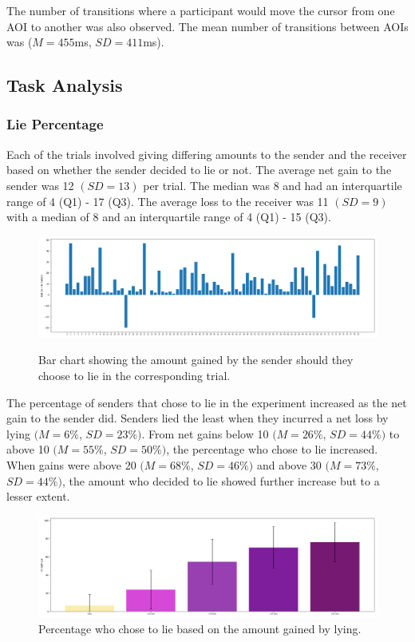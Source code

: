 \documentclass[man, floatsintext]{apa7}
\begin{document}
The number of transitions where a participant would move the cursor from one AOI to another was also observed. The mean number of transitions between AOIs was ($M = 455$ms, $SD = 411$ms).


\subsection{Task Analysis}

\subsubsection{Lie Percentage}

Each of the trials involved giving differing amounts to the sender and the receiver based on whether the sender decided to lie or not. The average net gain to the sender was 12 $(SD = 13)$ per trial. The median was 8 and had an interquartile range of 4 (Q1) - 17 (Q3). The average loss to the receiver was 11 $(SD = 9)$ with a median of 8 and an interquartile range of 4 (Q1) - 15 (Q3).

\begin{figure}[H]
	\caption{Bar chart showing the amount gained by the sender should they choose to lie in the corresponding trial.}
	\includegraphics[width=\linewidth]{../plots/TrialIndex/Gains.png}
	\label{fig:Gains}
\end{figure}

The percentage of senders that chose to lie in the experiment increased as the net gain to the sender did.  Senders lied the least when they incurred a net loss by lying $(M = 6\%$, $SD = 23\%)$. From net gains below 10 $(M = 26\%$, $SD = 44\%)$ to above 10 $(M = 55\%$, $SD = 50\%)$, the percentage who chose to lie increased. When gains were above 20 $(M = 68\%$, $SD = 46\%)$ and above 30 $(M = 73\%$, $SD = 44\%)$, the amount who decided to lie showed further increase but to a lesser extent.

\begin{figure}[H]
	\includegraphics[width=\linewidth]{../plots/RESPONSE/NetGainLie.png}
	\caption{Percentage who chose to lie based on the amount gained by lying.}
	\label{fig:NetGainLie}
\end{figure}
\end{document}

